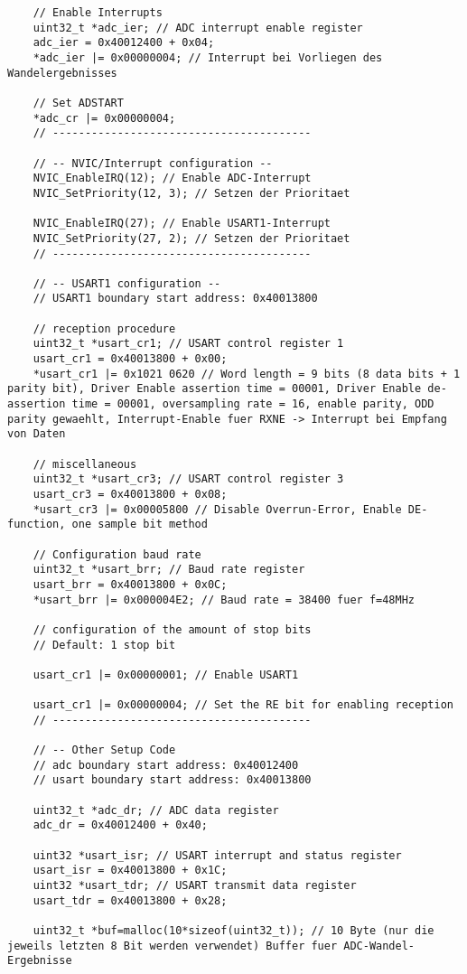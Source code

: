 \documentclass[11pt]{report}
\begin{document}
\begin{lstlisting}
	// Enable Interrupts
	uint32_t *adc_ier; // ADC interrupt enable register
	adc_ier = 0x40012400 + 0x04;
	*adc_ier |= 0x00000004; // Interrupt bei Vorliegen des Wandelergebnisses

	// Set ADSTART
	*adc_cr |= 0x00000004;
	// ----------------------------------------

	// -- NVIC/Interrupt configuration --
	NVIC_EnableIRQ(12); // Enable ADC-Interrupt
	NVIC_SetPriority(12, 3); // Setzen der Prioritaet

	NVIC_EnableIRQ(27); // Enable USART1-Interrupt
	NVIC_SetPriority(27, 2); // Setzen der Prioritaet
	// ----------------------------------------

	// -- USART1 configuration --
	// USART1 boundary start address: 0x40013800

	// reception procedure
	uint32_t *usart_cr1; // USART control register 1
	usart_cr1 = 0x40013800 + 0x00;
	*usart_cr1 |= 0x1021 0620 // Word length = 9 bits (8 data bits + 1 parity bit), Driver Enable assertion time = 00001, Driver Enable de-assertion time = 00001, oversampling rate = 16, enable parity, ODD parity gewaehlt, Interrupt-Enable fuer RXNE -> Interrupt bei Empfang von Daten

	// miscellaneous
	uint32_t *usart_cr3; // USART control register 3
	usart_cr3 = 0x40013800 + 0x08;
	*usart_cr3 |= 0x00005800 // Disable Overrun-Error, Enable DE-function, one sample bit method

	// Configuration baud rate
	uint32_t *usart_brr; // Baud rate register
	usart_brr = 0x40013800 + 0x0C;
	*usart_brr |= 0x000004E2; // Baud rate = 38400 fuer f=48MHz

	// configuration of the amount of stop bits
	// Default: 1 stop bit

	usart_cr1 |= 0x00000001; // Enable USART1

	usart_cr1 |= 0x00000004; // Set the RE bit for enabling reception
	// ----------------------------------------

	// -- Other Setup Code
	// adc boundary start address: 0x40012400
	// usart boundary start address: 0x40013800

	uint32_t *adc_dr; // ADC data register
	adc_dr = 0x40012400 + 0x40;
	
	uint32 *usart_isr; // USART interrupt and status register
	usart_isr = 0x40013800 + 0x1C;
	uint32 *usart_tdr; // USART transmit data register
	usart_tdr = 0x40013800 + 0x28;

	uint32_t *buf=malloc(10*sizeof(uint32_t)); // 10 Byte (nur die jeweils letzten 8 Bit werden verwendet) Buffer fuer ADC-Wandel-Ergebnisse


\end{lstlisting}
\end{document}
